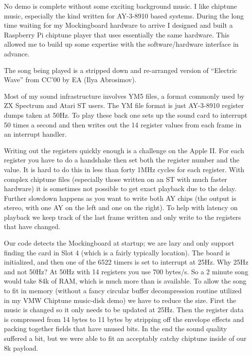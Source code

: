 \documentclass[twocolumn]{article}
\begin{document}
No demo is complete without some exciting background music.
I like chiptune music, especially the kind written
for AY-3-8910 based systems.
During the long time waiting for my Mockingboard hardware to arrive
I designed and built a Raspberry Pi chiptune player that uses
essentially the same hardware.
This allowed me to build up some expertise with the software/hardware
interface in advance.

The song being played is a stripped down and re-arranged version of
``Electric Wave'' from CC'00 by EA (Ilya Abrosimov). 

Most of my sound infrastructure involves YM5 files, a format commonly
used by ZX Spectrum and Atari ST users.
The YM file format is just AY-3-8910 register dumps taken at 50Hz.  
To play these back one sets up the sound card to interrupt 50 times a second
and then writes out the 14 register values from each frame in an interrupt
handler.


Writing out the registers quickly enough is a challenge on the Apple II.
For each register you have to do a handshake then set both the register 
number and the value.
It is hard to do this in less than forty 1MHz cycles for each register.
With complex chiptune files (especially those written on an ST with much
faster hardware) it is sometimes not possible to get exact playback
due to the delay.
Further slowdown happens as you want to write both AY chips (the output
is stereo, with one AY on the left and one on the right).
To help with latency on playback we keep track of the last frame written
and only write to the registers that have changed.


Our code detects the Mockingboard at startup; we are lazy and only support
finding the card in Slot 4 (which is a fairly typically location).
The board is initialized, and then one of the 6522 timers is set to
interrupt at 25Hz.
Why 25Hz and not 50Hz?  At 50Hz with 14 registers you use 700 bytes/s.
So a 2 minute song would take 84k of RAM, which is much more than is available.
To allow the song to fit in memory (without a fancy circular buffer
decompression routine utilized in my VMW Chiptune music-disk demo) we have
to reduce the size.
First the music is changed so it only needs to be updated at 25Hz.
Then the register data is compressed from 14 bytes to 11 bytes by stripping off
the envelope effects and packing together fields that have unused bits.
In the end the sound quality suffered a bit, but we were able to fit an
acceptably catchy chiptune inside of our 8k payload.
\end{document}

